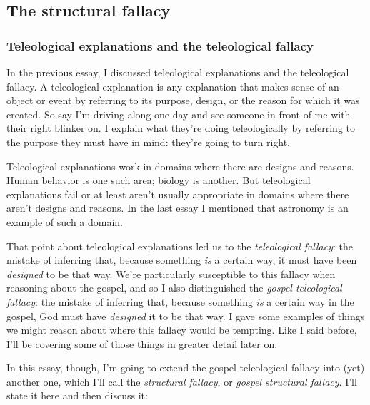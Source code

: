 \subsection{The structural fallacy}

	\subsubsection{Teleological explanations and the teleological fallacy}
	
		In the previous essay,
			I discussed teleological explanations and the teleological fallacy.
		A teleological explanation is any explanation that makes sense of an object or event by referring to its purpose,
			design,
				or the reason for which it was created.
		So say I'm driving along one day and see someone in front of me with their right blinker on.
		I explain what they're doing teleologically by referring to the purpose they must have in mind:
			they're going to turn right.
			
		Teleological explanations work in domains where there are designs and reasons.
		Human behavior is one such area;
			biology is another.
		But teleological explanations fail or at least aren't usually appropriate in domains where there aren't designs and reasons.
		In the last essay I mentioned that astronomy is an example of such a domain.
		
		That point about teleological explanations led us to the \textit{teleological fallacy}:
			the mistake of inferring that,
				because something \textit{is} a certain way,
					it must have been \textit{designed} to be that way.
		We're particularly susceptible to this fallacy when reasoning about the gospel,
		and so I also distinguished the \textit{gospel teleological fallacy}:
			the mistake of inferring that,
				because something \textit{is} a certain way in the gospel,
					God must have \textit{designed} it to be that way.
		I gave some examples of things we might reason about where this fallacy would be tempting.
		Like I said before,
			I'll be covering some of those things in greater detail later on.
			
		In this essay,
			though,
				I'm going to extend the gospel teleological fallacy into (yet) another one,
					which I'll call the \textit{structural fallacy},
						or \textit{gospel structural fallacy}.
		I'll state it here and then discuss it:
		
